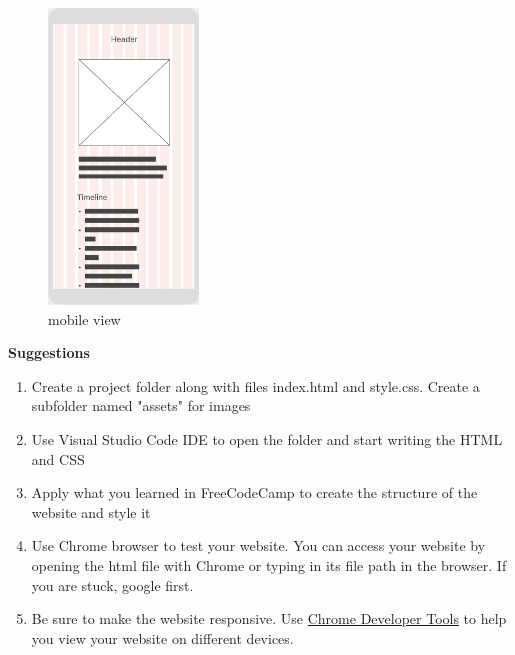 \documentclass{42-en}
\begin{document}
\begin{figure}[H]
        \begin{center}
            \includegraphics[width=4cm]{wireframe_mobile.png}\\
            mobile view
        \end{center}
    \end{figure}
\textbf{Suggestions}
\begin{enumerate}
    \item Create a project folder along with files index.html and style.css. Create a subfolder named "assets" for images
    \item Use Visual Studio Code IDE to open the folder and start writing the HTML and CSS
    \item Apply what you learned in FreeCodeCamp to create the structure of the website and style it
    \item Use Chrome browser to test your website. You can access your website by opening the html file with Chrome or typing in its file path in the browser. If you are stuck, google first.
    \item Be sure to make the website responsive. Use \href{https://developers.google.com/web/tools/chrome-devtools/device-mode}{Chrome Developer Tools} to help you view your website on different devices.
\end{enumerate}

\end{document}
